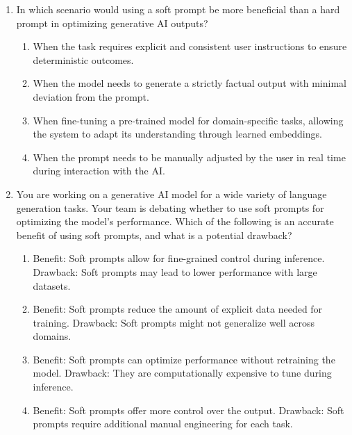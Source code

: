 \begin{enumerate}[resume,leftmargin=*]
\begin{enumerate}[label=\Alph*.]
  \item Input the dataset, manually adjust the learning rate and batch size, and export the fine-tuned model without evaluation.
  \item Load the model, automatically adjust its architecture, and deploy it to production.
\end{enumerate}
\item In which scenario would using a soft prompt be more beneficial than a hard prompt in optimizing generative AI outputs?
\begin{enumerate}[label=\Alph*.]
  \item When the task requires explicit and consistent user instructions to ensure deterministic outcomes.
  \item When the model needs to generate a strictly factual output with minimal deviation from the prompt.
  \item When fine-tuning a pre-trained model for domain-specific tasks, allowing the system to adapt its understanding through learned embeddings.
  \item When the prompt needs to be manually adjusted by the user in real time during interaction with the AI.
\end{enumerate}
\item You are working on a generative AI model for a wide variety of language generation tasks. Your team is debating whether to use soft prompts for optimizing the model's performance. Which of the following is an accurate benefit of using soft prompts, and what is a potential drawback?
\begin{enumerate}[label=\Alph*.]
  \item Benefit: Soft prompts allow for fine-grained control during inference. Drawback: Soft prompts may lead to lower performance with large datasets.
  \item Benefit: Soft prompts reduce the amount of explicit data needed for training. Drawback: Soft prompts might not generalize well across domains.
  \item Benefit: Soft prompts can optimize performance without retraining the model. Drawback: They are computationally expensive to tune during inference.
  \item Benefit: Soft prompts offer more control over the output. Drawback: Soft prompts require additional manual engineering for each task.
\end{enumerate}
\end{enumerate}

